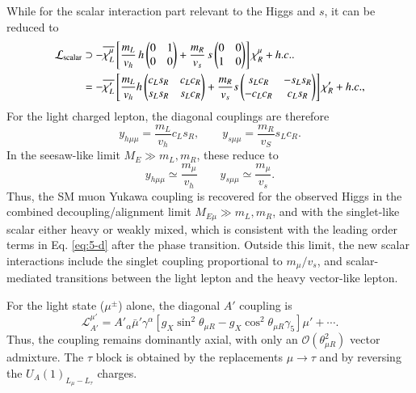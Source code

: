 \documentclass[onecolumn, aps, nofootinbib, prd, preprint, floats, floatfix, amsmath, amssymb, superscriptaddress, preprintnumbers]{revtex4-2}
\begin{document}
While for the scalar interaction part relevant to the Higgs and $s$, it can be reduced to
\begin{equation}
\begin{aligned}
\mathcal{L}_{\rm scalar} &
\supset-\overline{\chi_L^\mu}
\left[
\frac{m_L}{v_h}\,h
\begin{pmatrix}
0&1\\
0&0
\end{pmatrix}
+
\frac{m_R}{v_s}\,s
\begin{pmatrix}
0&0\\
1&0
\end{pmatrix}
\right]\chi_R^\mu
+h.c. .\\
&=-\overline{\chi'_L}
\left[\frac{m_L}{v_h} h \begin{pmatrix}
c_Ls_R&c_Lc_R\\
s_Ls_R&s_Lc_R
\end{pmatrix}+ \frac{m_R}{v_s} s \begin{pmatrix}
s_Lc_R&-s_Ls_R\\
-c_Lc_R&c_Ls_R
\end{pmatrix}\right]\chi'_R+h.c.,
\label{eq:gauge-basis-scalar-yukawa}
\end{aligned}
\end{equation}
For the light charged lepton, the diagonal couplings are therefore
\begin{equation}
y_{h\mu\mu}=
\frac{m_L}{v_h}c_Ls_R,
\qquad
y_{s\mu\mu}=\frac{m_R}{v_S}s_Lc_R .
\label{eq:light-scalar-yukawa}
\end{equation}
In the seesaw-like limit $M_E\gg m_L,m_R$, these reduce to
\begin{equation}
y_{h\mu\mu}\simeq
\frac{m_\mu}{v_h}
\qquad
y_{s\mu\mu}\simeq \frac{m_\mu}{v_s}.
\label{eq:sm-limit-scalar-yukawa}
\end{equation}
Thus, the SM muon Yukawa coupling is recovered for the observed Higgs in the combined decoupling/alignment limit $M_{E\mu}\gg m_L,m_R$, and with the singlet-like scalar either heavy or weakly mixed, which is consistent with the leading order terms in Eq. \eqref{eq:5-d} after the phase transition. Outside this limit, the new scalar interactions include the singlet coupling proportional to $m_\mu/v_s$, and scalar-mediated transitions between the light lepton and the heavy vector-like lepton.

For the light state ($\mu^\pm$) alone, the diagonal $A'$ coupling is
\begin{equation}
\mathcal{L}_{A'}^{\mu'}
=
A'_\alpha\bar\mu'\gamma^\alpha
\left[
g_X\sin^2\theta_{\mu R}
-g_X\cos^2\theta_{\mu R} \gamma_5
\right]\mu'
+\cdots .
\label{eq:light-muon-Apr}
\end{equation}
Thus, the coupling remains dominantly axial, with only an $\mathcal{O}(\theta_{\mu R}^2)$ vector admixture. The $\tau$ block is obtained by the replacements $\mu\to\tau$ and by reversing the $U_A(1)_{L_\mu-L_\tau}$ charges.
\end{document}
